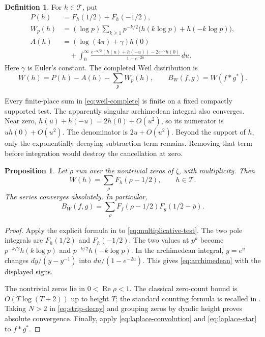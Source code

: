 \documentclass[11pt,letterpaper]{article}
\newtheorem{proposition}[theorem]{Proposition}
\theoremstyle{definition}
\newtheorem{definition}[theorem]{Definition}
\theoremstyle{remark}
\newcommand{\T}{\mathcal T}
\newcommand{\Rea}{\operatorname{Re}}
\begin{document}
\begin{definition}\label{def:local-correspondence:weil}
For $h\in\T$, put
\begin{align}
 P(h)&=F_h(1/2)+F_h(-1/2),\label{eq:poles}\\
 W_p(h)&=(\log p)\sum_{k\ge1}p^{-k/2}
          \bigl(h(k\log p)+h(-k\log p)\bigr),\label{eq:local-weil}\\
 A(h)&=(\log(4\pi)+\gamma)h(0)\nonumber\\
 &\quad+\int_0^\infty
 \frac{e^{-u/2}(h(u)+h(-u))-2e^{-u}h(0)}{1-e^{-2u}}\,du.
 \label{eq:archimedean}
\end{align}
Here $\gamma$ is Euler's constant. The completed Weil distribution is
\begin{equation}\label{eq:weil-complete}
 W(h)=P(h)-A(h)-\sum_pW_p(h),\qquad
 B_W(f,g)=W(f*g^*).
\end{equation}
\end{definition}

Every finite-place sum in \eqref{eq:weil-complete} is finite on a fixed
compactly supported test. The apparently singular archimedean integral
also converges. Near zero,
$h(u)+h(-u)=2h(0)+O(u^2)$, so its numerator is $u h(0)+O(u^2)$.
The denominator is $2u+O(u^2)$. Beyond the support of $h$, only the
exponentially decaying subtraction term remains. Removing that term
before integration would destroy the cancellation at zero.

\begin{proposition}\label{prop:explicit-formula}
Let $\rho$ run over the nontrivial zeros of $\zeta$, with multiplicity.
Then
\begin{equation}\label{eq:zero-sum}
 W(h)=\sum_\rho F_h(\rho-1/2),\qquad h\in\T.
\end{equation}
The series converges absolutely. In particular,
\begin{equation}\label{eq:mixed-zero-sum}
 B_W(f,g)=\sum_\rho F_f(\rho-1/2)
      \overline{F_g(1/2-\overline\rho)}.
\end{equation}
\end{proposition}

\begin{proof}
Apply the explicit formula in \cite[Appendix B, equations (147) to
(150)]{CC2020} to \eqref{eq:multiplicative-test}. The two pole integrals
are $F_h(1/2)$ and $F_h(-1/2)$. The two values at $p^k$ become
$p^{-k/2}h(k\log p)$ and $p^{-k/2}h(-k\log p)$.
In the archimedean integral, $y=e^u$ changes
$dy/(y-y^{-1})$ into $du/(1-e^{-2u})$. This gives
\eqref{eq:archimedean} with the displayed signs.

The nontrivial zeros lie in $0<\Rea\rho<1$. The classical zero-count
bound is $O(T\log(T+2))$ up to height $T$; the standard counting formula
is recalled in \cite[Section 2]{Connes2026}. Taking $N>2$ in
\eqref{eq:strip-decay} and grouping zeros by dyadic height proves
absolute convergence. Finally, apply
\eqref{eq:laplace-convolution} and \eqref{eq:laplace-star} to $f*g^*$.
\end{proof}
\end{document}
